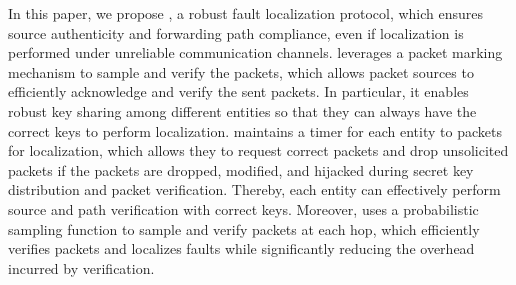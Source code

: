 In this paper, we propose \name{}, a robust fault localization protocol, which ensures source authenticity and forwarding path compliance, even if localization is performed under unreliable communication channels. 
\name{} leverages a packet marking mechanism to sample and verify the packets, which allows packet sources to efficiently acknowledge and verify the sent packets. In particular, it enables robust key sharing among different entities so that they can always have the correct keys to perform localization.   
\name{} maintains a timer for each entity to packets for localization, which allows they to request correct packets and drop unsolicited packets if the packets are dropped, modified, and hijacked during secret key distribution and packet verification. %
Thereby, each entity can effectively perform source and path verification with correct keys.  
Moreover, \name{} uses a probabilistic sampling function to sample and verify packets at each hop, which efficiently verifies packets and localizes faults while significantly reducing the overhead incurred by verification. 

